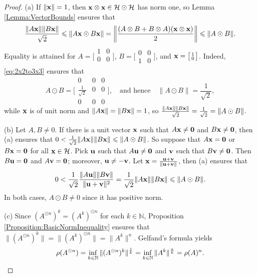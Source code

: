 \documentclass[10pt,reqno]{amsart}
\newcommand{\0}{{\color{lightgray}0}}
\renewcommand{\leq}{\leqslant}
\newcommand{\N}{\mathbb{N}}
\newcommand{\h}{\mathcal{H}}
\renewcommand{\vec}[1]{{\bf #1}}
\theoremstyle{definition}
\numberwithin{equation}{section}
\begin{document}
\begin{proof}
(a) If $ \|\vec{x}\| = 1$, then $\vec{x} \otimes \vec{x} \in \h \odot \h$ has norm one, so
Lemma \ref{Lemma:VectorBounds} ensures that
\begin{equation*}
\frac{ \|A\vec{x}\| \|B\vec{x}\|}{\sqrt{2}} \leq \| A\vec{x} \odot B\vec{x} \| = \left\|\frac{(A \otimes B + B \otimes A) (\vec{x} \otimes \vec{x})}{2} \right\| \leq \| A \odot B \|.
\end{equation*}
Equality is attained for
$A = \big[\begin{smallmatrix}
 1 & 0 \\
 0 & 0 \\
\end{smallmatrix}\big]$, 
$B = \big[\begin{smallmatrix}
 0 & 0 \\
 1 & 0 
\end{smallmatrix}\big]$, and
$\vec{x} = \big[ \begin{smallmatrix} 1 \\ 0 \end{smallmatrix} \big]$.  Indeed,
\eqref{eq:2x2to3x3} ensures that
\begin{equation*}
A \odot B 
= 
\bigg[
\begin{smallmatrix}
0 & 0 & 0 \\
\frac{1}{\sqrt{2}} & 0 & 0 \\
0 & 0 & 0 
\end{smallmatrix}
\bigg],
\quad \text{and hence} \quad
\| A \odot B \| = \frac{1}{\sqrt{2}},
\end{equation*}
while $\vec{x}$ is of unit norm and $\|A\vec{x}\| = \| B\vec{x} \| = 1$, so $\frac{ \|A\vec{x}\| \|B\vec{x}\|}{\sqrt{2}} = \frac{1}{\sqrt{2}} = \| A \odot B \|  $.

\medskip\noindent(b) 
Let $A,B \neq 0$.  If there is a unit vector $\vec{x}$ such that 
$A \vec{x} \neq \vec{0}$ and $B \vec{x} \neq \vec{0}$, then (a) ensures that
$0< \frac{1}{\sqrt{2}} \| A\vec{x} \| \| B \vec{x} \| \leq \| A \odot B\|$.
So suppose that $A\vec{x} = \vec{0}$ or $B\vec{x} = \vec{0}$ for all $\vec{x}\in \h$.
Pick $\vec{u}$ such that $ A \vec{u} \neq \vec{0}$ and $\vec{v} $ such that  $ B \vec{v} \neq \vec{0}$. 
Then $B \vec{u} =\vec{0}$ and $A \vec{v} =\vec{0}$; moreover, $\vec{u}\neq -\vec{v}$.
Let $\vec{x} = \frac{\vec{u} + \vec{v}}{ \| \vec{u} + \vec{v} \| }$, then (a) ensures that
\begin{equation*}
0 <  \frac{1}{\sqrt{2}} \frac{ \|A \vec{u} \| \| B \vec{v} \| }{\| \vec{u} + \vec{v} \|^2 } 
=  \frac{1}{\sqrt{2}} \| A\vec{x} \| \| B\vec{x} \|  \leq  \| A \odot B \|.
\end{equation*}
In both cases, $A \odot B\neq 0 $ since it has positive norm.

\medskip\noindent(c) Since $ (A^{\odot n})^k =  (A^k)^{\odot n}$ for each $k \in \N$, 
Proposition \ref{Proposition:BasicNormInequality} ensures that
$ \| (A^{\odot n})^k \| = \|(A^k)^{\odot n} \| = \|A^k\|^n$. Gelfand's formula \cite[Prop.~3.8, Ch.~5]{Conway} yields
$$\rho ( A^{\odot n}) = \inf_{k \in \mathbb{N}} \| (A^{\odot n})^k \|^{\frac{1}{k}}  = \inf_{k \in \mathbb{N}} \|A^k\|^{\frac{n}{k}} =  \rho(A)^n. \qedhere
$$
\end{proof}
\end{document}
